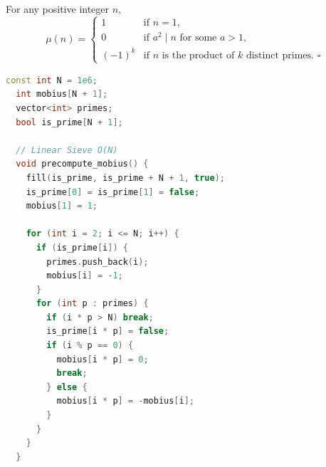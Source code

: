 For any positive integer $n$,
\[
\mu(n) = 
\begin{cases} 
1 & \text{if } n = 1, \\
0 & \text{if } a^2 \mid n \text{ for some } a > 1, \\
(-1)^k & \text{if } n \text{ is the product of } k \text{ distinct primes. } \square
\end{cases}
\]
\begin{lstlisting}[language=c++]
  const int N = 1e6;
  int mobius[N + 1];
  vector<int> primes;
  bool is_prime[N + 1];

  // Linear Sieve O(N)
  void precompute_mobius() {
    fill(is_prime, is_prime + N + 1, true);
    is_prime[0] = is_prime[1] = false;
    mobius[1] = 1;

    for (int i = 2; i <= N; i++) {
      if (is_prime[i]) {
        primes.push_back(i);
        mobius[i] = -1;
      }
      for (int p : primes) {
        if (i * p > N) break;
        is_prime[i * p] = false;
        if (i % p == 0) {
          mobius[i * p] = 0;
          break;
        } else {
          mobius[i * p] = -mobius[i];
        }
      }
    }
  }
\end{lstlisting}
